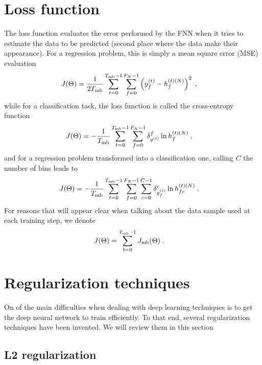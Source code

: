 \section{Loss function} \label{sec:FNNlossfunction}

The loss function evaluates the error performed by the FNN when it tries to estimate the data to be predicted (second place where the data make their appearance). For a regression problem, this is simply a mean square error (MSE) evaluation
\begin{align}
J(\Theta)&=\frac{1}{2T_{{\rm mb}}}\sum_{t=0}^{T_{{\rm mb}}-1}\sum_{f=0}^{F_N-1}
%
\left(y_f^{(t)}-h_{f}^{(t)(N)}\right)^2\;,
\end{align}
while for a classification task, the loss function is called the cross-entropy function
\begin{align}
J(\Theta)&=-\frac{1}{T_{{\rm mb}}}\sum_{t=0}^{T_{{\rm mb}}-1}\sum_{f=0}^{F_N-1}
%
\delta^f_{y^{(t)}}\ln h_{f}^{(t)(N)}\;,
\end{align}
and for a regression problem transformed into a classification one, calling $C$ the number of bins leads to
\begin{align}
J(\Theta)&=-\frac{1}{T_{{\rm mb}}}\sum_{t=0}^{T_{{\rm mb}}-1}\sum_{f=0}^{F_N-1}\sum_{c=0}^{C-1}
%
\delta^c_{y_f^{(t)}}\ln h_{fc}^{(t)(N)}\;.
\end{align}
For reasons that will appear clear when talking about the data sample used at each training step, we denote
\begin{align}
J(\Theta)&=\sum_{t=0}^{T_{{\rm mb}}-1}J_{{\rm mb}}(\Theta)\;.
\end{align}

\section{Regularization techniques}

On of the main difficulties when dealing with deep learning techniques is to get the deep neural network to train efficiently. To that end, several regularization techniques have been invented. We will review them in this section

\subsection{L2 regularization}

